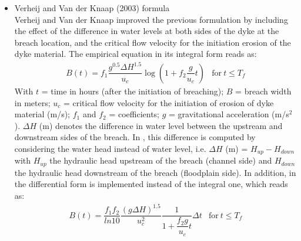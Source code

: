 \begin{itemize}
\item Verheij and Van der Knaap (2003) formula \\
Verheij and Van der Knaap \cite{Verheij2003} improved the previous formulation
by including the effect of the difference in water levels at both sides of the
dyke at the breach location, and the critical flow velocity for the initiation
erosion of the dyke material. The empirical equation in its integral form reads as:
\begin{equation}
\label{eq:Verheij2003}
\begin{array}{lc}
B(t)=f_1\dfrac{g^{0.5}\Delta H^{1.5}}{u_c}\log\left(1+f_2\dfrac{g}{u_c}t\right) & \text{for}~t\leq T_f
\end{array}
\end{equation}
With $t$ = time in hours (after the initiation of breaching); $B$ = breach width
in meters; $u_c$ = critical flow velocity for the initiation of erosion of dyke
material (m/s); $f_1$ and $f_2$ = coefficients; $g$ = gravitational acceleration (m/s$^2$).
$\Delta H$ (m) denotes the difference in water level between the upstream and
downstream sides of the breach. In , this difference is computed by
considering the water head instead of water level, i.e. $\Delta H$ (m) =
$H_{up}-H_{down}$ with $H_{up}$ the hydraulic head upstream of the breach
(channel side) and $H_{down}$ the hydraulic head downstream of the breach
(floodplain side).
In addition, in  the differential form is implemented instead of the
integral one, which reads as:
\begin{equation}
\label{eq:Verheij2003:diff}
\begin{array}{lc}
B(t)=\dfrac{f_1 f_2}{ln 10}\dfrac{(g\Delta H)^{1.5}}{u_c^2}\dfrac{1}{1+\dfrac{f_2g}{u_c}t}\Delta t & \text{for}~t\leq T_f
\end{array}
\end{equation}


\end{itemize}
